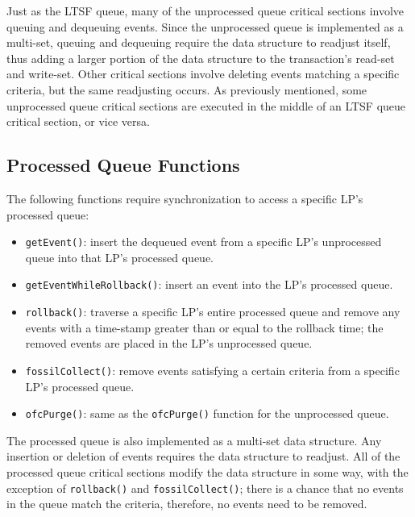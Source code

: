 \documentclass[11pt]{book}
\begin{document}
Just as the LTSF queue, many of the unprocessed queue critical sections involve
queuing and dequeuing events.  Since the unprocessed queue is implemented as a
multi-set, queuing and dequeuing require the data structure to readjust itself,
thus adding a larger portion of the data structure to the transaction's read-set
and write-set.  Other critical sections involve deleting events matching a
specific criteria, but the same readjusting occurs.  As previously mentioned,
some unprocessed queue critical sections are executed in the middle of an LTSF
queue critical section, or vice versa.

\subsection{Processed Queue Functions}

The following functions require synchronization to access a specific LP's processed queue:

\vspace*{-\bigskipamount}
\begin{singlespace}
\begin{itemize}
  \item\texttt{getEvent()}: insert the dequeued event from a specific LP's unprocessed
    queue into that LP's processed queue.
  \item\texttt{getEventWhileRollback()}: insert an event into the LP's processed
      queue.
  \item\texttt{rollback()}: traverse a specific LP's entire processed queue and remove any
    events with a time-stamp greater than or equal to the rollback time; the removed
    events are placed in the LP's unprocessed queue.
  \item\texttt{fossilCollect()}: remove events satisfying a certain criteria from a
    specific LP's processed queue.
    \item\texttt{ofcPurge()}: same as the \texttt{ofcPurge()} function for the unprocessed queue.
\end{itemize}
\end{singlespace}

The processed queue is also implemented as a multi-set data structure.
Any insertion or deletion of events requires the data structure to readjust.
All of the processed queue critical sections modify the data structure in some
way, with the exception of \texttt{rollback()} and \texttt{fossilCollect()};
there is a chance that no events in the queue match the criteria, therefore, no
events need to be removed.
\end{document}

